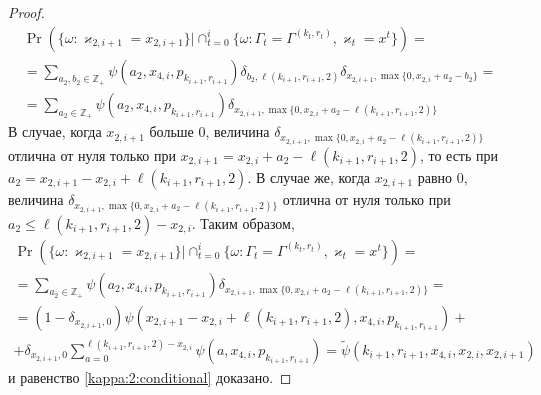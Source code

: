 \documentclass[a4paper,12pt,russian]{extarticle}
\begin{document}
\begin{proof}
\begin{multline*}
\Pr (\{ \omega \colon \varkappa_{2,i+1} = x_{2,i+1}\} |\cap_{t=0}^{i}\{\omega\colon \Gamma_t=\Gamma^{(k_t,r_t)}, \varkappa_t=x^t\}) = \\
=\sum_{a_2,b_2\in \mathbb{Z}_+}\psi(a_2,x_{4,i}, p_{k_{i+1},r_{i+1}})  \delta_{b_2,\ell(k_{i+1},r_{i+1},2)}   \delta_{x_{2,i+1},\max\{0,x_{2,i}+a_2-b_2\}}=\\
=\sum_{a_2\in \mathbb{Z}_+}\psi(a_2,x_{4,i}, p_{k_{i+1},r_{i+1}})   \delta_{x_{2,i+1},\max\{0,x_{2,i}+a_2-\ell(k_{i+1},r_{i+1},2)\}}
\end{multline*}
В случае, когда $x_{2,i+1}$ больше $0$, величина $\delta_{x_{2,i+1},\max\{0,x_{2,i}+a_2-\ell(k_{i+1},r_{i+1},2)\}}$ отлична от нуля только при $x_{2,i+1}=x_{2,i}+a_2-\ell(k_{i+1},r_{i+1},2)$, то есть при $a_2=x_{2,i+1}-x_{2,i}+\ell(k_{i+1},r_{i+1},2)$. В случае же, когда $x_{2,i+1}$ равно $0$, величина $\delta_{x_{2,i+1},\max\{0,x_{2,i}+a_2-\ell(k_{i+1},r_{i+1},2)\}}$ отлична от нуля только при $ a_2\leqslant \ell(k_{i+1},r_{i+1},2)-x_{2,i}$. Таким образом,
\begin{multline*}
\Pr (\{ \omega \colon \varkappa_{2,i+1} = x_{2,i+1}\} |\cap_{t=0}^{i}\{\omega\colon \Gamma_t=\Gamma^{(k_t,r_t)}, \varkappa_t=x^t\}) = \\
= \sum_{a_2\in \mathbb{Z}_+}\psi(a_2,x_{4,i}, p_{k_{i+1},r_{i+1}})   \delta_{x_{2,i+1},\max\{0,x_{2,i}+a_2-\ell(k_{i+1},r_{i+1},2)\}} = \\
=(1 - \delta_{x_{2,i+1},0})\psi(x_{2,i+1}-x_{2,i}+\ell(k_{i+1},r_{i+1},2),x_{4,i}, p_{k_{i+1},r_{i+1}})  + \\
+ \delta_{x_{2,i+1},0}\sum_{a=0}^{\ell(k_{i+1},r_{i+1},2)-x_{2,i}} \psi(a,x_{4,i}, p_{k_{i+1},r_{i+1}})= \widetilde{\psi}(k_{i+1},r_{i+1},x_{4,i},x_{2,i},x_{2,i+1})
\end{multline*}
и равенство \eqref{kappa:2:conditional} доказано.
\end{proof}
\end{document}
